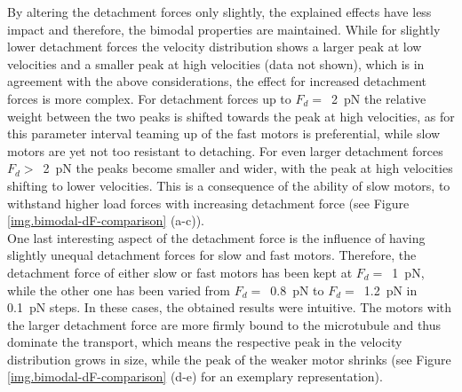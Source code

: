 By altering the detachment forces only slightly, the explained effects have less impact and therefore, the bimodal properties are maintained. While for slightly lower detachment forces the velocity
distribution shows a larger peak at low velocities and a smaller peak at high velocities (data not shown), which is in agreement with the above considerations, the effect for increased detachment forces is more
complex. For detachment forces up to \mbox{$F_{d} = $ \SI{2}{\pico\newton}} the relative weight between the two peaks is shifted towards the peak at high velocities, as for this parameter interval
teaming up of the fast motors is preferential, while slow motors are yet not too resistant to detaching. For even larger detachment forces \mbox{$F_{d} > $ \SI{2}{\pico\newton}} the peaks become
smaller and wider, with the peak at high velocities shifting to lower velocities. This is a consequence of the ability of slow motors, to withstand higher load forces with increasing detachment
force (see Figure \ref{img.bimodal-dF-comparison} (a-c)). \\
One last interesting aspect of the detachment force is the influence of having slightly unequal detachment forces for slow and fast motors. Therefore, the detachment force of either slow or fast
motors has been kept at \mbox{$F_{d} = $ \SI{1}{\pico\newton}}, while the other one has been varied from \mbox{$F_{d} = $ \SI{0.8}{\pico\newton}} to \mbox{$F_{d} = $ \SI{1.2}{\pico\newton}} in 
\SI{0.1}{\pico\newton} steps. In these cases, the obtained results were intuitive. The motors with the larger detachment force are more firmly bound to the microtubule and thus dominate the
transport, which means the respective peak in the velocity distribution grows in size, while the peak of the weaker motor shrinks (see Figure \ref{img.bimodal-dF-comparison} (d-e) for an exemplary
representation). \\
